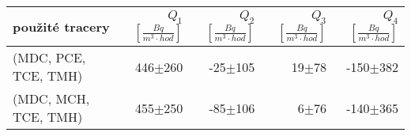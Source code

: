 \begin{tabular}{lrrrr}
\toprule
použité tracery & $Q_1$ $\left[\si{\frac{Bq}{m^3\cdot hod}}\right]$ & $Q_2$ $\left[\si{\frac{Bq}{m^3\cdot hod}}\right]$ & $Q_3$ $\left[\si{\frac{Bq}{m^3\cdot hod}}\right]$ & $Q_4$ $\left[\si{\frac{Bq}{m^3\cdot hod}}\right]$ \\
\midrule
(MDC, PCE, TCE, TMH) & 446$\pm$260 & -25$\pm$105 & 19$\pm$78 & -150$\pm$382 \\
(MDC, MCH, TCE, TMH) & 455$\pm$250 & -85$\pm$106 &  6$\pm$76 & -140$\pm$365 \\
\bottomrule
\end{tabular}
